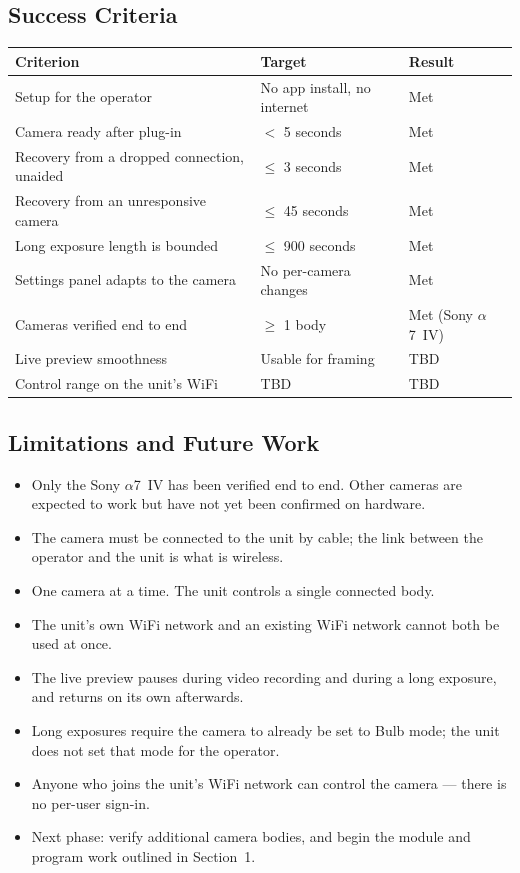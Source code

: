 \documentclass[11pt,a4paper]{article}
\begin{document}
\subsection{Success Criteria}
\begin{tabular}{p{} p{} p{}}
    \toprule
    \textbf{Criterion} & \textbf{Target} & \textbf{Result} \\
    \midrule
    Setup for the operator            & No app install, no internet & Met \\
    Camera ready after plug-in        & $<$ 5 seconds               & Met \\
    Recovery from a dropped connection, unaided & $\leq$ 3 seconds  & Met \\
    Recovery from an unresponsive camera & $\leq$ 45 seconds        & Met \\
    Long exposure length is bounded   & $\leq$ 900 seconds          & Met \\
    Settings panel adapts to the camera & No per-camera changes     & Met \\
    Cameras verified end to end       & $\geq$ 1 body               & Met (Sony $\alpha$7~IV) \\
    Live preview smoothness           & Usable for framing          & TBD \\
    Control range on the unit's WiFi  & TBD                         & TBD \\
    \bottomrule
\end{tabular}

\subsection{Limitations and Future Work}
\begin{itemize}[leftmargin=1.5em]
    \item Only the Sony $\alpha$7~IV has been verified end to end. Other cameras are expected to work but have not yet been confirmed on hardware.
    \item The camera must be connected to the unit by cable; the link between the operator and the unit is what is wireless.
    \item One camera at a time. The unit controls a single connected body.
    \item The unit's own WiFi network and an existing WiFi network cannot both be used at once.
    \item The live preview pauses during video recording and during a long exposure, and returns on its own afterwards.
    \item Long exposures require the camera to already be set to Bulb mode; the unit does not set that mode for the operator.
    \item Anyone who joins the unit's WiFi network can control the camera --- there is no per-user sign-in.
    \item Next phase: verify additional camera bodies, and begin the module and program work outlined in Section~1.
\end{itemize}
\end{document}
